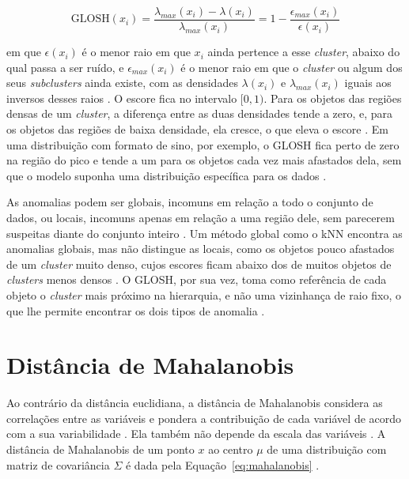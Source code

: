 \documentclass{uflamon}          %
\begin{document}
\begin{equation}
    \mathrm{GLOSH}(x_i) = \frac{\lambda_{max}(x_i) - \lambda(x_i)}{\lambda_{max}(x_i)} = 1 - \frac{\epsilon_{max}(x_i)}{\epsilon(x_i)}
    \label{eq:glosh}
\end{equation}

em que $\epsilon(x_i)$ é o menor raio em que $x_i$ ainda pertence a esse \textit{cluster}, abaixo do qual passa a ser ruído, e $\epsilon_{max}(x_i)$ é o menor raio em que o \textit{cluster} ou algum dos seus \textit{subclusters} ainda existe, com as densidades $\lambda(x_i)$ e $\lambda_{max}(x_i)$ iguais aos inversos desses raios \cite{campello2015}. O escore fica no intervalo $[0, 1)$. Para os objetos das regiões densas de um \textit{cluster}, a diferença entre as duas densidades tende a zero, e, para os objetos das regiões de baixa densidade, ela cresce, o que eleva o escore \cite{ghosh2024}. Em uma distribuição com formato de sino, por exemplo, o GLOSH fica perto de zero na região do pico e tende a um para os objetos cada vez mais afastados dela, sem que o modelo suponha uma distribuição específica para os dados \cite{campello2015}.

As anomalias podem ser globais, incomuns em relação a todo o conjunto de dados, ou locais, incomuns apenas em relação a uma região dele, sem parecerem suspeitas diante do conjunto inteiro \cite{campello2015}. Um método global como o kNN encontra as anomalias globais, mas não distingue as locais, como os objetos pouco afastados de um \textit{cluster} muito denso, cujos escores ficam abaixo dos de muitos objetos de \textit{clusters} menos densos \cite{campello2015}. O GLOSH, por sua vez, toma como referência de cada objeto o \textit{cluster} mais próximo na hierarquia, e não uma vizinhança de raio fixo, o que lhe permite encontrar os dois tipos de anomalia \cite{campello2015}.

\section{Distância de Mahalanobis}
\label{sec:mahalanobis}

Ao contrário da distância euclidiana, a distância de Mahalanobis considera as correlações entre as variáveis e pondera a contribuição de cada variável de acordo com a sua variabilidade . Ela também não depende da escala das variáveis \cite{ghorbani2019}. A distância de Mahalanobis de um ponto $x$ ao centro $\mu$ de uma distribuição com matriz de covariância $\Sigma$ é dada pela Equação~\ref{eq:mahalanobis} \cite{ghorbani2019}.
\end{document}
